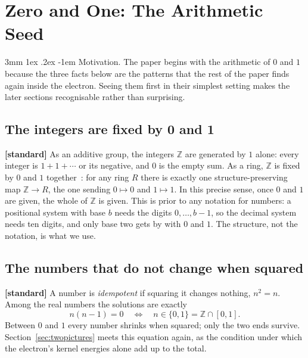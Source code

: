 \documentclass[%
 reprint, amsmath,amssymb, aps, prb, ]{revtex4-2}
\makeatletter
\numberwithin{equation}{section}
\renewcommand\paragraph{%
  \@startsection{paragraph}{4}{\z@}%
    {3mm \@plus 1ex \@minus .2ex}%
    {-1em}%
    {\normalfont\normalsize\itshape}}
\makeatother
\begin{document}
\section{Zero and One: The Arithmetic Seed}
\label{sec:arith}

\paragraph{Motivation.} The paper begins with the arithmetic of $0$ and $1$ because the three facts below are the patterns that the rest of the paper finds again inside the electron. Seeing them first in their simplest setting makes the later sections recognisable rather than surprising.

\subsection{The integers are fixed by 0 and 1}

\textbf{[standard]} As an additive group, the integers $\mathbb{Z}$ are generated by $1$ alone: every integer is $1+1+\cdots$ or its negative, and $0$ is the empty sum. As a ring, $\mathbb{Z}$ is fixed by $0$ and $1$ together~\cite{ref:lang}: for any ring $R$ there is exactly one structure-preserving map $\mathbb{Z}\to R$, the one sending $0\mapsto0$ and $1\mapsto1$. In this precise sense, once $0$ and $1$ are given, the whole of $\mathbb{Z}$ is given. This is prior to any notation for numbers: a positional system with base $b$ needs the digits $0,\dots,b-1$, so the decimal system needs ten digits, and only base two gets by with $0$ and $1$. The structure, not the notation, is what we use.

\subsection{The numbers that do not change when squared}

\textbf{[standard]} A number is \emph{idempotent} if squaring it changes nothing, $n^2=n$. Among the real numbers the solutions are exactly
\begin{equation}
n(n-1)=0 \quad\Longleftrightarrow\quad n\in\{0,1\} = \mathbb{Z}\cap[0,1].
\label{eq:idem}
\end{equation}
Between $0$ and $1$ every number shrinks when squared; only the two ends survive. Section~\ref{sec:twopictures} meets this equation again, as the condition under which the electron's kernel energies alone add up to the total.
\end{document}
